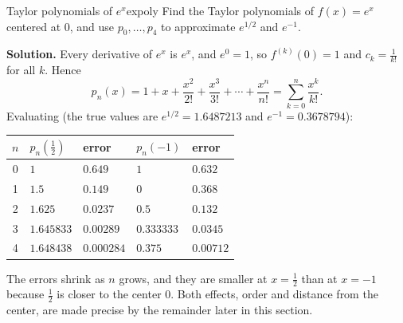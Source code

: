 \documentclass[11pt]{article}
\begin{document}
\begin{exmp}{Taylor polynomials of $e^x$}{expoly}
Find the Taylor polynomials of $f(x)=e^x$ centered at $0$, and use $p_0,\dots,p_4$ to approximate $e^{1/2}$ and $e^{-1}$.

\textbf{Solution.} Every derivative of $e^x$ is $e^x$, and $e^0=1$, so $f^{(k)}(0)=1$ and $c_k=\frac1{k!}$ for all $k$. Hence
\[
p_n(x)=1+x+\frac{x^2}{2!}+\frac{x^3}{3!}+\cdots+\frac{x^n}{n!}=\sum_{k=0}^n\frac{x^k}{k!}.
\]
Evaluating (the true values are $e^{1/2}=1.6487213$ and $e^{-1}=0.3678794$):
\begin{center}
\begin{tabular}{@{}cllll@{}}\toprule
$n$ & $p_n(\frac12)$ & error & $p_n(-1)$ & error\\\midrule
0 & $1$ & $0.649$ & $1$ & $0.632$\\
1 & $1.5$ & $0.149$ & $0$ & $0.368$\\
2 & $1.625$ & $0.0237$ & $0.5$ & $0.132$\\
3 & $1.645833$ & $0.00289$ & $0.333333$ & $0.0345$\\
4 & $1.648438$ & $0.000284$ & $0.375$ & $0.00712$\\\bottomrule
\end{tabular}
\end{center}
The errors shrink as $n$ grows, and they are smaller at $x=\frac12$ than at $x=-1$ because $\frac12$ is closer to the center $0$. Both effects, order and distance from the center, are made precise by the remainder later in this section.
\end{exmp}
\end{document}
